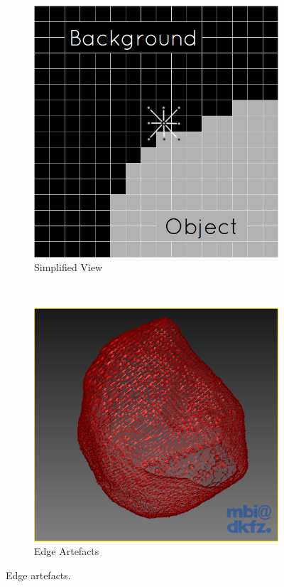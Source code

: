 \begin{figure}[h]
  \centering
  \begin{subfigure}[b]{0.5\textwidth}
    \includegraphics[width=\textwidth]{images/thresholding/thresholdvariation1example.png}
    \caption{Simplified View}
    \label{fig:thresholdingvariation1example}
  \end{subfigure}%
  ~ %
  \begin{subfigure}[b]{0.5\textwidth}
    \includegraphics[width=\textwidth]{images/thresholding/thresholdvariation1problem.png}
    \caption{Edge Artefacts}
    \label{fig:thresholdingvariation1artefacts}
  \end{subfigure}
  \caption{Edge artefacts.}\label{fig:thresholdingvariation1problem}
\end{figure}

